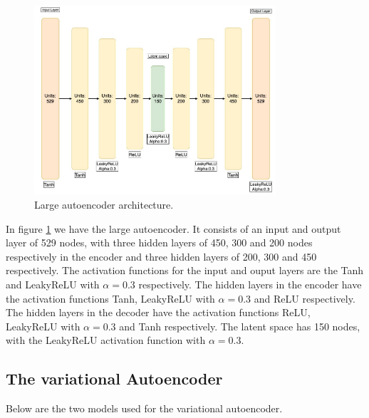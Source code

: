 \begin{figure}[h!]
    \centering
    \includegraphics[width=0.8\textwidth]{Figures/nnarchitect/ae_big.jpeg}
    \caption{Large autoencoder architecture.}
    \label{fig:ae_big}
\end{figure}

In figure \ref{fig:ae_big} we have the large autoencoder. It consists of an input and output layer of 529 nodes, with three 
hidden layers of 450, 300 and 200 nodes respectively in the encoder and three hidden layers of 200, 300 and 450 respectively. 
The activation functions for the input and ouput layers are the Tanh and LeakyReLU with $\alpha=0.3$ respectively. The hidden 
layers in the encoder have the activation functions Tanh, LeakyReLU with $\alpha=0.3$ and ReLU respectively. The hidden layers
in the decoder have the activation functions ReLU, LeakyReLU with $\alpha=0.3$ and Tanh respectively. The latent space has 150 nodes,
with the LeakyReLU activation function with $\alpha=0.3$.
\subsection*{The variational Autoencoder}
Below are the two models used for the variational autoencoder. 

